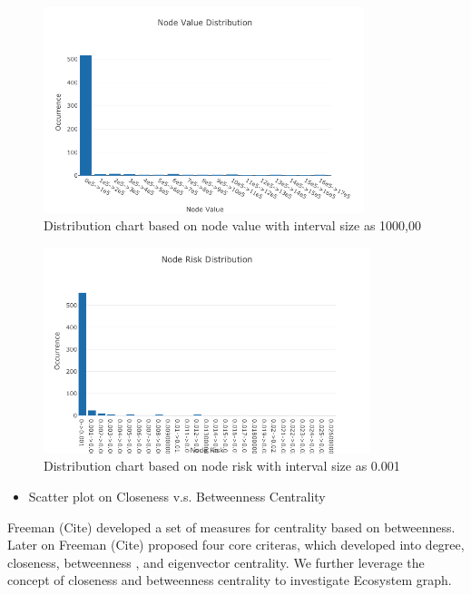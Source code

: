 \documentclass[letterpaper, 10 pt, conference]{ieeeconf}  %
\begin{document}
\begin{figure}[h!]
  \includegraphics[width=\linewidth, height=6cm]{node_value_distribution.png}
  \caption{Distribution chart based on node value with interval size as 1000,00}
  \label{fig:node_value_distribution}
\end{figure}

\begin{figure}[h!]
  \includegraphics[width=\linewidth, height=6cm]{node_risk_distribution.png}
  \caption{Distribution chart based on node risk with interval size as 0.001}
  \label{fig:node_risk_distribution}
\end{figure}

\begin{itemize}
\item Scatter plot on Closeness v.s. Betweenness Centrality
\end{itemize}

Freeman (Cite) developed a set of measures for centrality based on betweenness. Later on Freeman (Cite) proposed four core criteras, which developed into degree, closeness, betweenness , and eigenvector centrality. We further leverage the concept of closeness and betweenness centrality to investigate Ecosystem graph.
\end{document}
